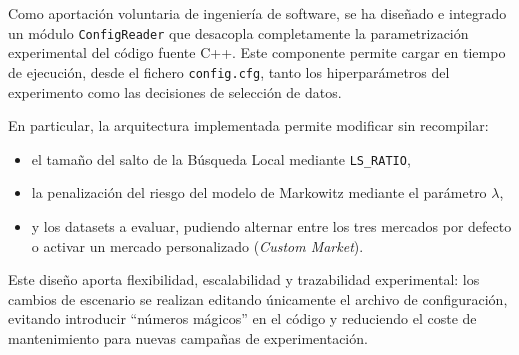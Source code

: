 Como aportación voluntaria de ingeniería de software, se ha diseñado e integrado un módulo \texttt{ConfigReader} que desacopla completamente la parametrización experimental del código fuente C++. Este componente permite cargar en tiempo de ejecución, desde el fichero \texttt{config.cfg}, tanto los hiperparámetros del experimento como las decisiones de selección de datos.

En particular, la arquitectura implementada permite modificar sin recompilar:
\begin{itemize}
    \item el tamaño del salto de la Búsqueda Local mediante \texttt{LS\_RATIO},
    \item la penalización del riesgo del modelo de Markowitz mediante el parámetro $\lambda$,
    \item y los datasets a evaluar, pudiendo alternar entre los tres mercados por defecto o activar un mercado personalizado (\textit{Custom Market}).
\end{itemize}

Este diseño aporta flexibilidad, escalabilidad y trazabilidad experimental: los cambios de escenario se realizan editando únicamente el archivo de configuración, evitando introducir ``números mágicos'' en el código y reduciendo el coste de mantenimiento para nuevas campañas de experimentación.
